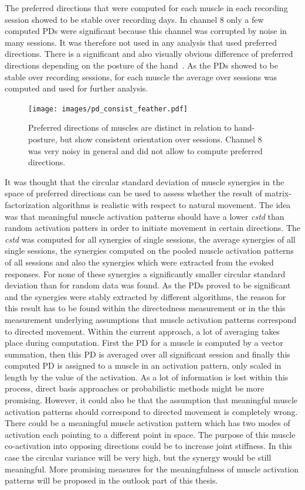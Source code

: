The preferred directions that were computed for each muscle in each recording session showed to
be stable over recording days. In channel 8 only a few computed PDs were significant because
this channel was corrupted by noise in many sessions. It was therefore not used in any analysis that
used preferred directions. There is a significant and also visually obvious difference of preferred directions
depending on the posture of the hand~. 
As the PDs showed to be stable over recording sessions, for each muscle the average over sessions was
computed and used for further analysis.
\begin{figure}[ht]
	\centering
		\texttt{[image: images/pd\_consist\_feather.pdf]}
	\caption{Preferred directions of muscles are distinct in relation to hand-posture, but show consistent
	orientation over sessions. Channel 8 was very noisy in general and did not allow to compute preferred directions.}
	\label{sg:fig:images_pd_consist_feather}
\end{figure}


It was thought that the circular standard deviation of muscle synergies in the 
space of preferred directions can be used to assess whether the result of matrix-factorization
algorithms is realistic with respect to natural movement. The idea was that meaningful muscle activation patterns 
should have a lower \emph{cstd} than random activation patters in order to initiate movement in certain directions. 
The \emph{cstd} was computed for all synergies of single sessions, the average synergies of all single sessions, the synergies
computed on the pooled muscle activation patterns of all sessions and also the synergies which
were extracted from the evoked responses. For none of these synergies a significantly smaller circular standard deviation 
than for random data was found. 
As the PDs proved to be significant and the synergies were stably extracted by different algorithms,
the reason for this result has to be found within the directedness measurement or in the this measurement
underlying assumptions that muscle activation patterns correspond to directed movement.
Within the current approach, a lot of averaging takes place during computation. First the PD for 
a muscle is computed by a vector summation, then this PD is averaged over all significant session
and finally this computed PD is assigned to a muscle in an activation pattern,
only scaled in length by the value of the activation. As a lot of information is lost within this process,
direct basis approaches or probabilistic methods might be more promising.
However, it could also be that the assumption that meaningful muscle activation patterns should correspond to
directed movement is completely wrong. There could be a meaningful muscle activation pattern
which has two modes of activation each pointing to a different point in space.
The purpose of this muscle co-activation into opposing directions could be to increase
joint stiffness. In this case the circular variance will be very high, but the synergy would be still meaningful. 
More promising measures for the meaningfulness of muscle activation patterns will be proposed in the outlook part
of this thesis.

